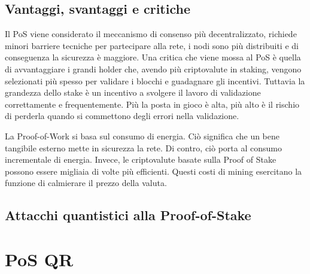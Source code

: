 \subsection{Vantaggi, svantaggi e critiche}
Il PoS viene considerato il meccanismo di consenso più decentralizzato, richiede minori barriere tecniche per partecipare alla rete, i nodi sono più distribuiti e di conseguenza la sicurezza è maggiore. Una critica che viene mossa al PoS è quella di avvantaggiare i grandi holder che, avendo più criptovalute in staking, vengono selezionati più spesso per validare i blocchi e guadagnare gli incentivi. Tuttavia la grandezza dello stake è un incentivo a svolgere il lavoro di validazione correttamente e frequentemente. Più la posta in gioco è alta, più alto è il rischio di perderla quando si commettono degli errori nella validazione.

La Proof-of-Work si basa sul consumo di energia. Ciò significa che un bene tangibile esterno mette in sicurezza la rete. Di contro, ciò porta al consumo incrementale di energia. Invece, le criptovalute basate sulla Proof of Stake possono essere migliaia di volte più efficienti. Questi costi di mining esercitano la funzione di calmierare il prezzo della valuta.

\subsection{Attacchi quantistici alla Proof-of-Stake}


\section{PoS QR}
